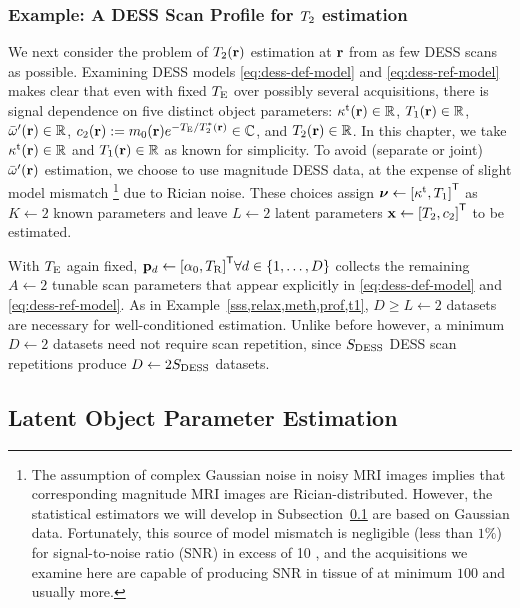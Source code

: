 \subsubsection{Example: A DESS Scan Profile for $T_2$ estimation}
\label{sss,relax,meth,prof,t2}

We next consider 
the problem of $\Tt\pr$ estimation at $\mathbf{r}$
from as few DESS scans as possible.
Examining DESS models 
\eqref{eq:dess-def-model} and \eqref{eq:dess-ref-model}
makes clear that even with fixed $T_\mathrm{E}$
over possibly several acquisitions, 
there is signal dependence 
on five distinct object parameters:
$\stx\pr \in \real$,
$\To\pr \in \real$, 
$\ompmed\pr \in \real$,
$\const{2}\pr := \mzero\pr e^{-\TE/\Tts\pr} \in \complex$, 
and $\Tt\pr \in \real$.
In this chapter,
we take $\stx\pr \in \real$ and $\To\pr \in \real$
as known for simplicity.
To avoid (separate or joint) $\ompmed\pr$ estimation,
we choose to use magnitude DESS data,
at the expense of slight model mismatch
\footnote{The assumption of complex Gaussian noise 
in noisy MRI images
implies that corresponding magnitude MRI images
are Rician-distributed.
However,
the statistical estimators
we will develop
in Subsection~\ref{ss,relax,meth,est}
are based on Gaussian data.
Fortunately,
this source of model mismatch
is negligible (less than $1\%$)
for signal-to-noise ratio (SNR)
in excess of 10 \cite{gudbjartsson:95:trd},
and the acquisitions we examine here
are capable of producing SNR in tissue 
of at minimum $100$ and usually more. 
}
due to Rician noise.
These choices assign 
$\bmnu \gets \brac{\stx, \To}\tpose$ 
as $K \gets 2$
known parameters
and leave $L \gets 2$
latent parameters  
$\bmx \gets \brac{\Tt, \const{2}}\tpose$
to be estimated.

With $T_\mathrm{E}$ again fixed, 
$\bmp_d \gets \brac{\flipnom, \TR}\tpose
\forall d \in \set{1,\dots,D}$
collects the remaining $A \gets 2$ 
tunable scan parameters
that appear explicitly in
\eqref{eq:dess-def-model} and \eqref{eq:dess-ref-model}.
As in Example~\ref{sss,relax,meth,prof,t1},
$D \geq L \gets 2$ datasets are necessary
for well-conditioned estimation.
Unlike before however,
a minimum $D \gets 2$ datasets 
need not require scan repetition,
since $S_{\mathrm{DESS}}$ DESS scan repetitions
produce $D \gets 2S_{\mathrm{DESS}}$ datasets.

\subsection{Latent Object Parameter Estimation}
\label{ss,relax,meth,est}

